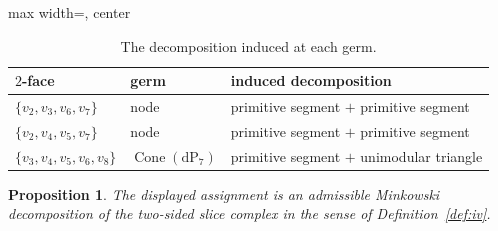 \documentclass[11pt]{amsart}
\newtheorem{proposition}[theorem]{Proposition}
\theoremstyle{definition}
\theoremstyle{remark}
\theoremstyle{plain}
\newcommand{\Cone}{\operatorname{Cone}}
\newcommand{\dP}{\mathrm{dP}}
\begin{document}
\begin{table}[ht]
\caption{The decomposition induced at each germ.}\label{tab:decomp}
\begin{adjustbox}{max width=\textwidth, center}
\begin{tabular}{lll}
\toprule
$2$-face & germ & induced decomposition \\
\midrule
$\{v_2,v_3,v_6,v_7\}$ & node & primitive segment $+$ primitive segment \\
$\{v_2,v_4,v_5,v_7\}$ & node & primitive segment $+$ primitive segment \\
$\{v_3,v_4,v_5,v_6,v_8\}$ & $\Cone(\dP_7)$ & primitive segment $+$ unimodular triangle \\
\bottomrule
\end{tabular}
\end{adjustbox}
\end{table}



\begin{proposition}\label{prop:admissible}
The displayed assignment is an admissible Minkowski decomposition of
the two-sided slice complex in the sense of Definition~\ref{def:iv}.
\end{proposition}
\end{document}
